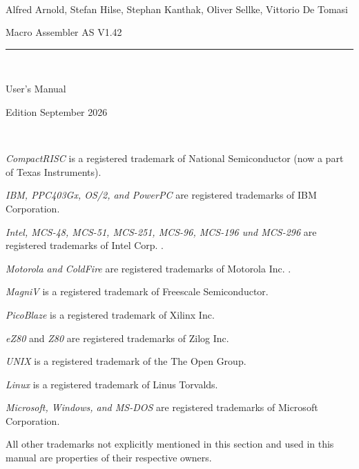 \documentclass[12pt,twoside]{report}
\newcommand{\asname}{{AS}}
\begin{document}
\thispagestyle{empty}

\
\vspace{7cm}\par

\begin{raggedright}
{\large Alfred Arnold, Stefan Hilse, Stephan Kanthak, Oliver
 Sellke, Vittorio De Tomasi}
\vspace{1cm}\par
{\huge Macro Assembler \asname{} V1.42}\\
\rule{9.5cm}{0.3mm}\\
\vspace{2mm}\par
{\huge User's Manual}

\vspace{1cm}\par

{\large Edition September 2026}
\end{raggedright}

\clearpage
\thispagestyle{empty}

\ \vspace{5cm}

{\em CompactRISC} is a registered trademark of National
 Semiconductor (now a part of Texas Instruments).

{\em IBM, PPC403Gx, OS/2, and PowerPC} are registered trademarks of IBM
Corporation.

{\em Intel, MCS-48, MCS-51, MCS-251, MCS-96, MCS-196 und MCS-296} are
registered trademarks of Intel Corp. .

{\em Motorola and ColdFire} are registered trademarks of Motorola Inc. .

{\em MagniV} is a registered trademark of Freescale Semiconductor.

{\em PicoBlaze} is a registered trademark of Xilinx Inc.

{\em eZ80} and {\em Z80} are registered trademarks of Zilog Inc. 

{\em UNIX} is a registered trademark of the The Open Group.

{\em Linux} is a registered trademark of Linus Torvalds.

{\em Microsoft, Windows, and MS-DOS} are registered trademarks of
Microsoft Corporation.

All other trademarks not explicitly mentioned in this section and used in
this manual are properties of their respective owners.

\vspace{5cm}
\end{document}
